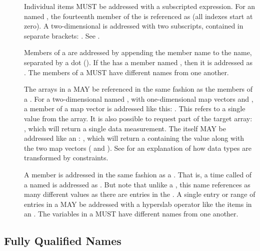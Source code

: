 \documentclass[justify]{nasa-ese}
\begin{document}
\begin{description}
\item[\Array] Individual \Array items MUST be addressed with a subscripted
  expression. For an \Array named , the fourteenth member of the
  \Array is referenced as  (all indexes start at zero). A
  two-dimensional \Array is addressed with two subscripts, contained in
  separate brackets: . See .

\item[\Structure] Members of a \Structure are addressed by appending
  the member name to the \Structure name, separated by a dot
  ().  If the \Structure {} has a member named
  , then it is addressed as .
  The members of a \Structure MUST have different names from one
  another. 

\item[\Grid] The arrays in a \Grid MAY be referenced in the same
  fashion as the members of a \Structure. For a two-dimensional \Grid
  named , with one-dimensional map vectors 
  and , a member of a map vector is addressed like
  this: . This refers to a single value from
  the  array. It is also possible to request part of the
  target array: , which will return a single
  data measurement. The \Grid itself MAY be addressed like an \Array:
  , which will return a \Grid containing the value
   along with the two map vectors
  ( and ). See
   for an explanation of how data types
  are transformed by constraints.

\item[\Sequence] A \Sequence member is addressed in the same fashion as a
  \Structure. That is, a time called  of a \Sequence named
   is addressed as . But note that
  unlike a \Structure, this name references as many different values as there
  are entries in the  \Sequence. A single entry or range of
  entries in a \Sequence MAY be addressed with a hyperslab operator like the
  items in an \Array. The variables in a \Sequence MUST have different names
  from one another.
\end{description}

\subsection{Fully Qualified Names}
\label{sec-FQN}
\end{document}
